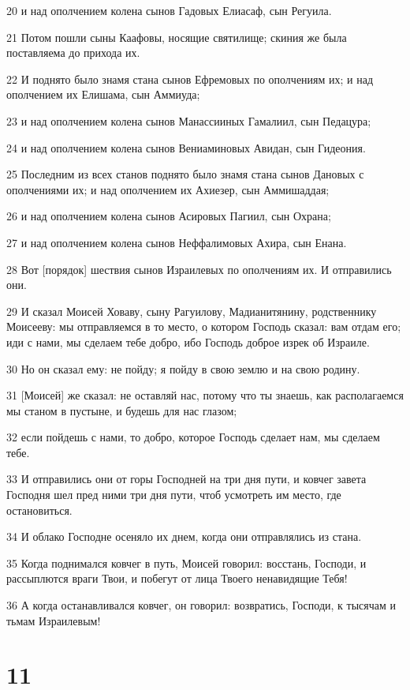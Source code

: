 \par 20 и над ополчением колена сынов Гадовых Елиасаф, сын Регуила.
\par 21 Потом пошли сыны Каафовы, носящие святилище; скиния же была поставляема до прихода их.
\par 22 И поднято было знамя стана сынов Ефремовых по ополчениям их; и над ополчением их Елишама, сын Аммиуда;
\par 23 и над ополчением колена сынов Манассииных Гамалиил, сын Педацура;
\par 24 и над ополчением колена сынов Вениаминовых Авидан, сын Гидеония.
\par 25 Последним из всех станов поднято было знамя стана сынов Дановых с ополчениями их; и над ополчением их Ахиезер, сын Аммишаддая;
\par 26 и над ополчением колена сынов Асировых Пагиил, сын Охрана;
\par 27 и над ополчением колена сынов Неффалимовых Ахира, сын Енана.
\par 28 Вот [порядок] шествия сынов Израилевых по ополчениям их. И отправились они.
\par 29 И сказал Моисей Ховаву, сыну Рагуилову, Мадианитянину, родственнику Моисееву: мы отправляемся в то место, о котором Господь сказал: вам отдам его; иди с нами, мы сделаем тебе добро, ибо Господь доброе изрек об Израиле.
\par 30 Но он сказал ему: не пойду; я пойду в свою землю и на свою родину.
\par 31 [Моисей] же сказал: не оставляй нас, потому что ты знаешь, как располагаемся мы станом в пустыне, и будешь для нас глазом;
\par 32 если пойдешь с нами, то добро, которое Господь сделает нам, мы сделаем тебе.
\par 33 И отправились они от горы Господней на три дня пути, и ковчег завета Господня шел пред ними три дня пути, чтоб усмотреть им место, где остановиться.
\par 34 И облако Господне осеняло их днем, когда они отправлялись из стана.
\par 35 Когда поднимался ковчег в путь, Моисей говорил: восстань, Господи, и рассыплются враги Твои, и побегут от лица Твоего ненавидящие Тебя!
\par 36 А когда останавливался ковчег, он говорил: возвратись, Господи, к тысячам и тьмам Израилевым!

\chapter{11}

